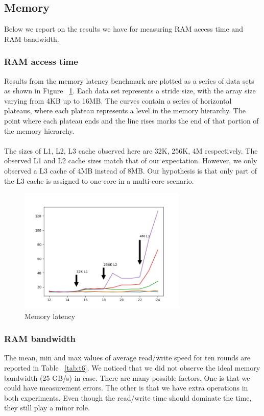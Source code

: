 \subsection{Memory}
Below we report on the results we have for measuring RAM access time and RAM bandwidth.

\subsubsection{RAM access time}
Results from the memory latency benchmark are
plotted as a series of data sets as shown in Figure ~\ref{fig:f1}.
Each data set represents a stride size, with the array
size varying from 4KB up to 16MB. The
curves contain a series of horizontal plateaus, where
each plateau represents a level in the memory hierarchy. The point where each plateau ends and the line
rises marks the end of that portion of the memory hierarchy.\\
\\
The sizes of L1, L2, L3 cache observed here are 32K, 256K, 4M respectively.
The observed L1 and L2 cache sizes match that of our expectation.
However, we only observed a L3 cache of 4MB instead of 8MB.
Our hypothesis is that
only part of the L3 cache is assigned to one core in a multi-core scenario.

\begin{figure}[htb]
    \includegraphics[width=8cm]{fig1_latency.png}
    \centering
    \caption{Memory latency}
    \label{fig:f1}
\end{figure}

\subsubsection{RAM bandwidth}
The mean, min and max values of average read/write speed for ten rounds are reported in Table ~\ref{tab:t6}. 
We noticed that we did not observe the ideal memory bandwidth (25 GB/s) in case.
There are many possible factors. 
One is that we could have measurement errors. 
The other is that we have extra operations in both experiments.
Even though the read/write time should dominate the time,
they still play a minor role.

